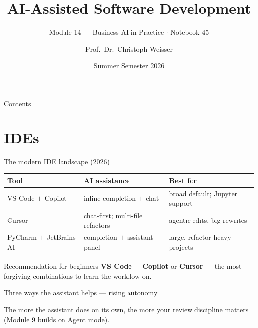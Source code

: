 \documentclass[aspectratio=169,11pt]{beamer}
\title{AI-Assisted Software Development}
\subtitle{Module 14 --- Business AI in Practice $\cdot$ Notebook 45}
\author{Prof.\ Dr.\ Christoph Weisser}
\institute{HSBI}
\date{Summer Semester 2026}
\begin{document}
\begin{frame}\titlepage\end{frame}

\begin{frame}{Contents}
  \tableofcontents[hideallsubsections]
\end{frame}

\section{IDEs}
\begin{frame}{The modern IDE landscape (2026)}
  \small
  \begin{center}
  \begin{tabular}{lp{4.4cm}p{3.6cm}}
    \toprule
    \textbf{Tool} & \textbf{AI assistance} & \textbf{Best for} \\
    \midrule
    VS Code $+$ Copilot & inline completion $+$ chat & broad default; Jupyter support \\
    Cursor              & chat-first; multi-file refactors & agentic edits, big rewrites \\
    PyCharm $+$ JetBrains AI & completion $+$ assistant panel & large, refactor-heavy projects \\
    \bottomrule
  \end{tabular}
  \end{center}
  \begin{exampleblock}{Recommendation for beginners}
    \textbf{VS Code $+$ Copilot} or \textbf{Cursor} --- the most forgiving combinations to learn the workflow on.
  \end{exampleblock}
\end{frame}

\begin{frame}{Three ways the assistant helps --- rising autonomy}
  \begin{center}
  \end{center}
  {\footnotesize The more the assistant does on its own, the more your review discipline matters (Module 9 builds on Agent mode).}
\end{frame}
\end{document}
